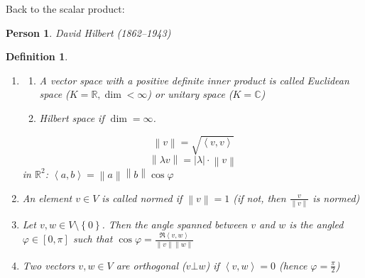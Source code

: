 \documentclass[a4paper]{article}
\newcounter{lecref}[section]
\numberwithin{lecref}{section}
\newtheorem{definition}[lecref]{Definition}
\newtheorem*{Person}{Person}
\newcommand{\set}[1]{\left\{#1\right\}}
\newcommand{\ip}[2]{\left\langle#1,#2\right\rangle} %
\newcommand{\norm}[1]{\left\|#1\right\|}
\newcommand{\card}[1]{\left|#1\right|}
\begin{document}
Back to the scalar product:

\begin{Person}
  David Hilbert (1862--1943)
\end{Person}

\begin{definition} %
  \begin{enumerate}
    \item
      \begin{enumerate}
        \item A vector space with a positive definite inner product
          is called \emph{Euclidean space} ($K = \mathbb R, \dim < \infty$)
          or \emph{unitary space} ($K = \mathbb C$)
        \item Hilbert space if $\dim = \infty$.
      \end{enumerate}

      \[ \norm{v} = \sqrt{\ip vv} \]
      \[ \norm{\lambda v} = \card{\lambda} \cdot \norm{v} \]
      in $\mathbb R^2$: $\ip ab = \norm{a} \norm{b} \cos{\varphi}$
    \item An element $v \in V$ is called \emph{normed} if $\norm{v} = 1$
      (if not, then $\frac{v}{\norm{v}}$ is normed)
    \item
      Let $v, w \in V \setminus \set{0}$. Then the angle spanned between $v$ and $w$ is the angled $\varphi \in [0, \pi]$
      such that $\cos{\varphi} = \frac{\Re{\ip vw}}{\norm{v} \norm{w}}$
    \item Two vectors $v, w \in V$ are orthogonal ($v \bot w$)
      if $\ip vw = 0$ (hence $\varphi = \frac\pi2$)
  \end{enumerate}
\end{definition}
\end{document}

